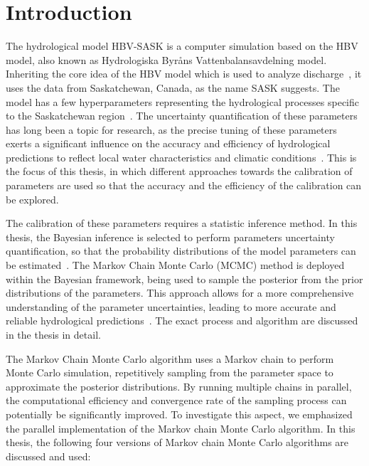 \chapter{Introduction}

The hydrological model HBV-SASK is a computer simulation based on the HBV model, also known as Hydrologiska Byråns Vattenbalansavdelning model. Inheriting the core idea of the HBV model which is used to analyze discharge~\cite{hbv_intro}, it uses the data from Saskatchewan, Canada, as the name SASK suggests. The model has a few hyperparameters representing the hydrological processes specific to the Saskatchewan region~\cite{hydrology}. The uncertainty quantification of these parameters has long been a topic for research, as the precise tuning of these parameters exerts a significant influence on the accuracy and efficiency of hydrological predictions to reflect local water characteristics and climatic conditions~\cite{hbv_calibration_intro}. This is the focus of this thesis, in which different approaches towards the calibration of parameters are used so that the accuracy and the efficiency of the calibration can be explored.

The calibration of these parameters requires a statistic inference method. In this thesis, the Bayesian inference is selected to perform parameters uncertainty quantification, so that the probability distributions of the model parameters can be estimated~\cite{bayesian_uq_intro}. The Markov Chain Monte Carlo (MCMC) method is deployed within the Bayesian framework, being used to sample the posterior from the prior distributions of the parameters. This approach allows for a more comprehensive understanding of the parameter uncertainties, leading to more accurate and reliable hydrological predictions~\cite{mcmc_practice}. The exact process and algorithm are discussed in the thesis in detail.

The Markov Chain Monte Carlo algorithm uses a Markov chain to perform Monte Carlo simulation, repetitively sampling from the parameter space to approximate the posterior distributions. By running multiple chains in parallel, the computational efficiency and convergence rate of the sampling process can potentially be significantly improved. To investigate this aspect, we emphasized the parallel implementation of the Markov chain Monte Carlo algorithm. In this thesis, the following four versions of Markov chain Monte Carlo algorithms are discussed and used:

